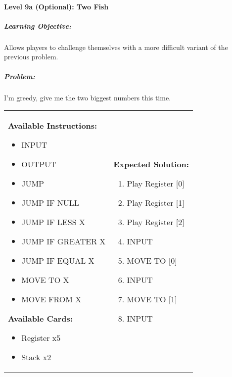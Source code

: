\paragraph{Level 9a (Optional): Two Fish}
\subparagraph{Learning Objective:} Allows players to challenge themselves with a more difficult variant of the previous problem.

\subparagraph{Problem:} I'm greedy, give me the two biggest numbers this time.

\begin{center}
    \begin{tabular}{ | m{5cm} | m{9cm} | } 
        \hline
            \textbf{Available Instructions:} 
            \begin{itemize}
                \setlength\itemsep{-.35em}
                \item INPUT
                \item OUTPUT
                \item JUMP
                \item JUMP IF NULL
                \item JUMP IF LESS X
                \item JUMP IF GREATER X
		\item JUMP IF EQUAL X
                \item MOVE TO X
                \item MOVE FROM X
            \end{itemize}
            \textbf{Available Cards:} 
            \begin{itemize}
                \setlength\itemsep{-.35em}
                \item Register x5
                \item Stack x2
            \end{itemize}& 
            \textbf{Expected Solution:} 
            \begin{enumerate}
                \setlength\itemsep{-.35em}
                \item Play Register [0]
                \item Play Register [1]
                \item Play Register [2]
                \item INPUT
                \item MOVE TO [0]
                \item INPUT
                \item MOVE TO [1]
                \item INPUT

\end{enumerate}
\end{tabular}
\end{center}
